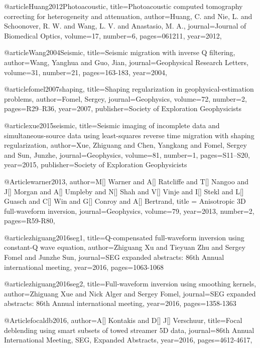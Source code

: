 {@article{Huang2012Photoacoustic,
  title={Photoacoustic computed tomography correcting for heterogeneity and attenuation},
  author={Huang, C. and Nie, L. and Schoonover, R. W. and Wang, L. V. and Anastasio, M. A.},
  journal={Journal of Biomedical Optics},
  volume={17},
  number={6},
  pages={061211},
  year={2012},
}

@article{Wang2004Seismic,
  title={Seismic migration with inverse {Q} filtering},
  author={Wang, Yanghua and Guo, Jian},
  journal={Geophysical Research Letters},
  volume={31},
  number={21},
  pages={163-183},
  year={2004},
}

@article{fomel2007shaping,
  title={Shaping regularization in geophysical-estimation problems},
  author={Fomel, Sergey},
  journal={Geophysics},
  volume={72},
  number={2},
  pages={R29--R36},
  year={2007},
  publisher={Society of Exploration Geophysicists}
}

@article{xue2015seismic,
  title={Seismic imaging of incomplete data and simultaneous-source data using least-squares reverse time migration with shaping regularization},
  author={Xue, Zhiguang and Chen, Yangkang and Fomel, Sergey and Sun, Junzhe},
  journal={Geophysics},
  volume={81},
  number={1},
  pages={S11--S20},
  year={2015},
  publisher={Society of Exploration Geophysicists}
}

@Article{warner2013,
  author={M[] Warner and A[] Ratcliffe and T[] Nangoo and J[] Morgan and A[] Umpleby and N[] Shah and V[] Vinje and I[] Stekl and L[] Guasch and C[] Win and G[] Conroy and A[] Bertrand},
  title = {Anisotropic 3{D} full-waveform inversion},
  journal={Geophysics},
  volume=79,
  year=2013,
  number=2,
  pages={R59-R80},
}


@article{zhiguang2016seg1,
  title={Q-compensated full-waveform inversion using constant-Q wave equation},
  author={Zhiguang Xu and Tieyuan Zhu and Sergey Fomel and Junzhe Sun},
  journal={SEG expanded abstracts: 86th Annual international meeting},
  year={2016},
  pages={1063-1068}
}

@article{zhiguang2016seg2,
  title={Full-waveform inversion using smoothing kernels},
  author={Zhiguang Xue and Nick Alger and Sergey Fomel},
  journal={SEG expanded abstracts: 86th Annual international meeting},
  year={2016},
  pages={1358-1363}
}


@Article{focaldb2016,
  author={A[] Kontakis and D[] J[] Verschuur},
  title={Focal deblending using smart subsets of towed streamer 5D data},
  journal={86th Annual International Meeting, SEG, Expanded Abstracts},
  year=2016,
  pages={4612-4617},
}

}
